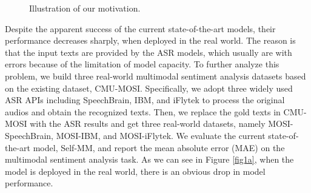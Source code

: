 \documentclass[11pt]{article}
\begin{document}
\begin{figure}[t]
	\begin{center}
		
	\end{center}
	\caption{Illustration of our motivation. }
\end{figure}


Despite the apparent success of the current state-of-the-art models, their performance decreases sharply, when deployed in the real world. The reason is that the input texts are provided by the ASR models, which usually are with errors because of the limitation of model capacity. To further analyze this problem, we build three real-world multimodal sentiment analysis datasets based on the existing dataset, CMU-MOSI\cite{zadeh2016mosi}. Specifically, we adopt three widely used ASR APIs including SpeechBrain, IBM, and iFlytek to process the original audios and obtain the recognized texts. Then, we replace the gold texts in CMU-MOSI with the ASR results and get three real-world datasets, namely MOSI-SpeechBrain, MOSI-IBM, and MOSI-iFlytek. We evaluate the current state-of-the-art model, Self-MM\cite{Yu_Xu_Yuan_Wu_2021}, and report the mean absolute error (MAE) on the multimodal sentiment analysis task. As we can see in Figure \ref{fig1a}, when the model is deployed in the real world, there is an obvious drop in model performance.
\end{document}
